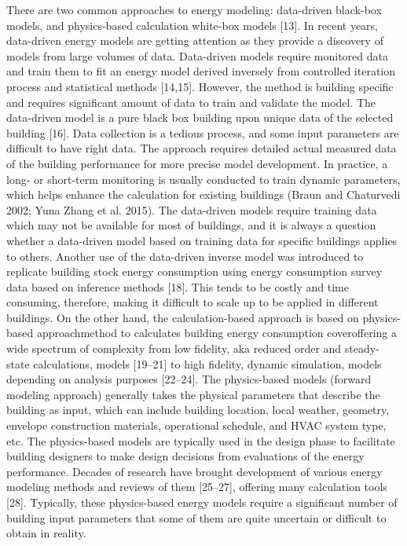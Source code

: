 There are two common approaches to energy modeling: data-driven black-box models, and physics-based calculation white-box models [13]. In recent years, data-driven energy models are getting attention as they provide a discovery of models from large volumes of data. Data-driven models require monitored data and train them to fit an energy model derived inversely from controlled iteration process and statistical methods [14,15]. However, the method is building specific and requires significant amount of data to train and validate the model. The data-driven model is a pure black box building upon unique data of the selected building [16]. Data collection is a tedious process, and some input parameters are difficult to have right data. The approach requires detailed actual measured data of the building performance for more precise model development. In practice, a long- or short-term monitoring is usually conducted to train dynamic parameters, which helps enhance the calculation for existing buildings (Braun and Chaturvedi 2002; Yuna Zhang et al. 2015). The data-driven models require training data which may not be available for most of buildings, and it is always a question whether a data-driven model based on training data for specific buildings applies to others. Another use of the data-driven inverse model was introduced to replicate building stock energy consumption using energy consumption survey data based on inference methods [18]. This tends to be costly and time consuming, therefore, making it difficult to scale up to be applied in different buildings. 
On the other hand, the calculation-based approach is based on physics-based approachmethod to calculates building energy consumption coveroffering a wide spectrum of complexity from low fidelity, aka reduced order and steady-state calculations, models [19–21] to high fidelity, dynamic simulation, models depending on analysis purposes [22–24]. The physics-based models (forward modeling approach) generally takes the physical parameters that describe the building as input, which can include building location, local weather, geometry, envelope construction materials, operational schedule, and HVAC system type, etc. The physics-based models are typically used in the design phase to facilitate building designers to make design decisions from evaluations of the energy performance. Decades of research have brought development of various energy modeling methods and reviews of them [25–27], offering many calculation tools [28]. Typically, these physics-based energy models require a significant number of building input parameters that some of them are quite uncertain or difficult to obtain in reality. 
